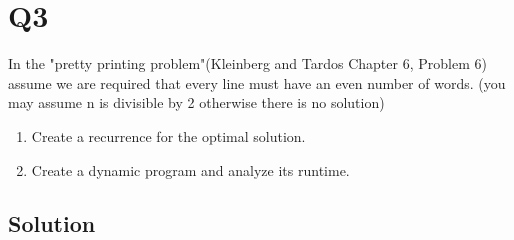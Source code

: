
\section*{Q3}

In the "pretty printing problem"(Kleinberg and Tardos Chapter 6, Problem 6) assume we are required that every line must have an even number of words.
(you may assume n is divisible by 2 otherwise there is no solution)

\begin{enumerate}
    \item Create a recurrence for the optimal solution.
    \item Create a dynamic program and analyze its runtime.
\end{enumerate}

\subsection*{Solution}

